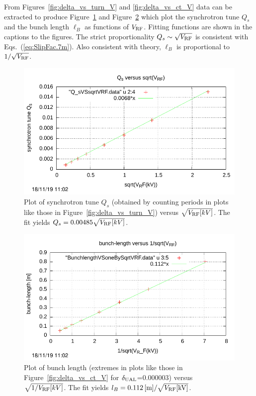 \documentclass[]{article}
\begin{document}
From Figures~\ref{fig:delta_vs_turn_V} and \ref{fig:delta_vs_ct_V}
data can be extracted to produce Figure~\ref{fig:QsVSsqrtVRF} and 
Figure~\ref{fig:BunchlengthVSoneBySqrtVRF} 
which plot the synchrotron tune $Q_s$ and the bunch length $\ell_B$
as functions of $V_{\rm RF}$.
Fitting functions are shown in the
captions to the figures. The strict proportionality 
$Q_s\sim\sqrt{V_{\rm RF}}$ is consistent with Eqs.~(\ref{eq:SlipFac.7m}).  
Also consistent with theory, $\ell_B$ is proportional 
to $1/\sqrt{V_{\rm RF}}$.
%
\begin{figure}[h]
\centering
\includegraphics[scale=1.0]{pdf/BM-III_Figure7.pdf}
\caption{\label{fig:QsVSsqrtVRF}Plot of synchrotron tune $Q_s$ 
(obtained by counting periods in plots like those in 
Figure~\ref{fig:delta_vs_turn_V}) versus $\sqrt{V_{\rm RF}[kV]}$.
The fit yields $Q_s=0.00485\sqrt{V_{\rm RF}[kV]}$.
}
\end{figure}
%
%
\begin{figure}[h]
\centering
\includegraphics[scale=1.0]{pdf/BM-III_Figure8.pdf}
\caption{\label{fig:BunchlengthVSoneBySqrtVRF}Plot of bunch length
(extremes in plots like those in Figure~\ref{fig:delta_vs_ct_V} for 
$\delta_{\rm UAL}$=0.000003) 
versus $\sqrt{1/V_{\rm RF}[kV]}$.
The fit yields $l_B=0.112\,[{\rm m}]/\sqrt{V_{\rm RF}[{\rm kV}]}$.
}
\end{figure}
%
\end{document}

